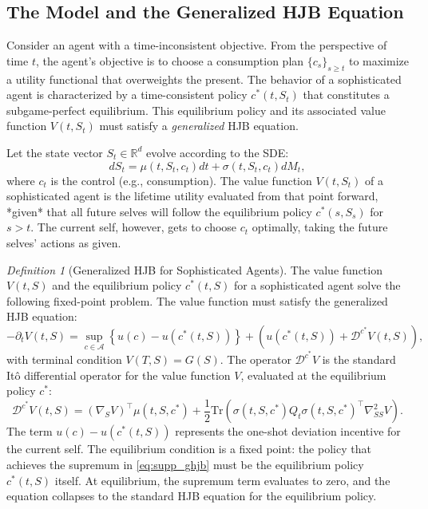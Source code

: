 \documentclass[ecta,draft]{econsocart}
\theoremstyle{plain}
\theoremstyle{remark}
\newtheorem{definition}{Definition}
\newcommand{\R}{\mathbb{R}}
\newcommand{\diffop}{\mathcal{D}}
\begin{document}
\subsection{The Model and the Generalized HJB Equation}

Consider an agent with a time-inconsistent objective. From the perspective of time $t$, the agent's objective is to choose a consumption plan $\{c_s\}_{s \geq t}$ to maximize a utility functional that overweights the present. The behavior of a sophisticated agent is characterized by a time-consistent policy $c^*(t, S_t)$ that constitutes a subgame-perfect equilibrium. This equilibrium policy and its associated value function $V(t, S_t)$ must satisfy a \textit{generalized} HJB equation.

Let the state vector $S_t \in \R^d$ evolve according to the SDE:
\begin{equation}
dS_t = \mu(t, S_t, c_t) dt + \sigma(t, S_t, c_t) dM_t,
\end{equation}
where $c_t$ is the control (e.g., consumption). The value function $V(t,S_t)$ of a sophisticated agent is the lifetime utility evaluated from that point forward, *given* that all future selves will follow the equilibrium policy $c^*(s, S_s)$ for $s > t$. The current self, however, gets to choose $c_t$ optimally, taking the future selves' actions as given.

\begin{definition}[Generalized HJB for Sophisticated Agents]
The value function $V(t,S)$ and the equilibrium policy $c^*(t,S)$ for a sophisticated agent solve the following fixed-point problem. The value function must satisfy the generalized HJB equation:
\begin{equation} \label{eq:supp_ghjb}
-\partial_t V(t,S) = \sup_{c \in \mathcal{A}} \left\{ u(c) - u(c^*(t,S)) \right\} + \left( u(c^*(t,S)) + \diffop^{c^*}V(t,S) \right),
\end{equation}
with terminal condition $V(T,S) = G(S)$. The operator $\diffop^{c^*}V$ is the standard It\^o differential operator for the value function $V$, evaluated at the equilibrium policy $c^*$:
\begin{equation}
\diffop^{c^*}V(t,S) = (\nabla_S V)^\top \mu(t,S,c^*) + \frac{1}{2}\text{Tr}\left(\sigma(t,S,c^*) Q_t \sigma(t,S,c^*)^\top \nabla_{SS}^2 V\right).
\end{equation}
The term $u(c) - u(c^*(t,S))$ represents the one-shot deviation incentive for the current self. The equilibrium condition is a fixed point: the policy that achieves the supremum in \eqref{eq:supp_ghjb} must be the equilibrium policy $c^*(t,S)$ itself. At equilibrium, the supremum term evaluates to zero, and the equation collapses to the standard HJB equation for the equilibrium policy.
\end{definition}
\end{document}
